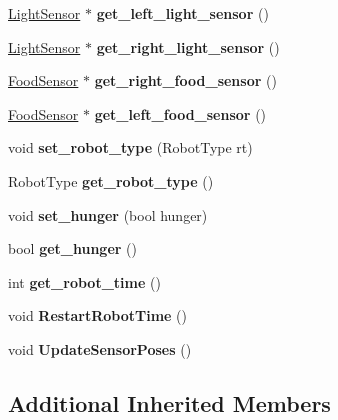 \begin{DoxyCompactItemize}
\mbox{\hyperlink{class_light_sensor}{Light\+Sensor}} $\ast$ {\bfseries get\+\_\+left\+\_\+light\+\_\+sensor} ()
\item 
\mbox{\label{class_robot_aff66784b080f5d7329a8f45d679d1b60}} 
\mbox{\hyperlink{class_light_sensor}{Light\+Sensor}} $\ast$ {\bfseries get\+\_\+right\+\_\+light\+\_\+sensor} ()
\item 
\mbox{\label{class_robot_acdf59a9f9124f4d8a910a2fa85e4d7c3}} 
\mbox{\hyperlink{class_food_sensor}{Food\+Sensor}} $\ast$ {\bfseries get\+\_\+right\+\_\+food\+\_\+sensor} ()
\item 
\mbox{\label{class_robot_a6bde50502517a623c309dbfbef546063}} 
\mbox{\hyperlink{class_food_sensor}{Food\+Sensor}} $\ast$ {\bfseries get\+\_\+left\+\_\+food\+\_\+sensor} ()
\item 
\mbox{\label{class_robot_ad811b955d24c95ebb16f0a2c185876a9}} 
void {\bfseries set\+\_\+robot\+\_\+type} (Robot\+Type rt)
\item 
\mbox{\label{class_robot_a1463b5699ff9a30a76768f7570b43b0d}} 
Robot\+Type {\bfseries get\+\_\+robot\+\_\+type} ()
\item 
\mbox{\label{class_robot_a3acf3a0f65d23859d7991667b09d28ef}} 
void {\bfseries set\+\_\+hunger} (bool hunger)
\item 
\mbox{\label{class_robot_aacdc924197b130a93046168cc31933a8}} 
bool {\bfseries get\+\_\+hunger} ()
\item 
\mbox{\label{class_robot_ae8f5051655c730486561e43be5602ca7}} 
int {\bfseries get\+\_\+robot\+\_\+time} ()
\item 
\mbox{\label{class_robot_a80dc608c5bf63c6d3b814a9f36fde462}} 
void {\bfseries Restart\+Robot\+Time} ()
\item 
\mbox{\label{class_robot_a1227689786b8842a3cd14204a98c891d}} 
void {\bfseries Update\+Sensor\+Poses} ()
\end{DoxyCompactItemize}
\subsection*{Additional Inherited Members}


